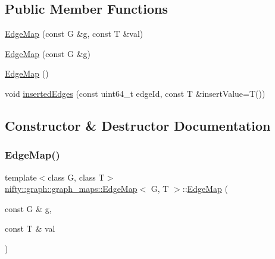 \subsection*{Public Member Functions}
\begin{DoxyCompactItemize}
\item 
\hyperlink{structnifty_1_1graph_1_1graph__maps_1_1EdgeMap_a76af091031717407e07ffb154f74e653}{Edge\+Map} (const G \&g, const T \&val)
\item 
\hyperlink{structnifty_1_1graph_1_1graph__maps_1_1EdgeMap_a5100202d40822e8cf98aea0ee90ee01e}{Edge\+Map} (const G \&g)
\item 
\hyperlink{structnifty_1_1graph_1_1graph__maps_1_1EdgeMap_adfef359098c94982e5a8f6355d068878}{Edge\+Map} ()
\item 
void \hyperlink{structnifty_1_1graph_1_1graph__maps_1_1EdgeMap_aa658ff2e5952fce8342349a159425bbd}{inserted\+Edges} (const uint64\+\_\+t edge\+Id, const T \&insert\+Value=T())
\end{DoxyCompactItemize}


\subsection{Constructor \& Destructor Documentation}
\mbox{\label{structnifty_1_1graph_1_1graph__maps_1_1EdgeMap_a76af091031717407e07ffb154f74e653}} 
\subsubsection{\texorpdfstring{Edge\+Map()}{EdgeMap()}\hspace{0.1cm}{\footnotesize\ttfamily [1/3]}}
{\footnotesize\ttfamily template$<$class G, class T$>$ \\
\hyperlink{structnifty_1_1graph_1_1graph__maps_1_1EdgeMap}{nifty\+::graph\+::graph\+\_\+maps\+::\+Edge\+Map}$<$ G, T $>$\+::\hyperlink{structnifty_1_1graph_1_1graph__maps_1_1EdgeMap}{Edge\+Map} (\begin{DoxyParamCaption}\item[{const G \&}]{g,  }\item[{const T \&}]{val }\end{DoxyParamCaption})\hspace{0.3cm}{\ttfamily [inline]}}

